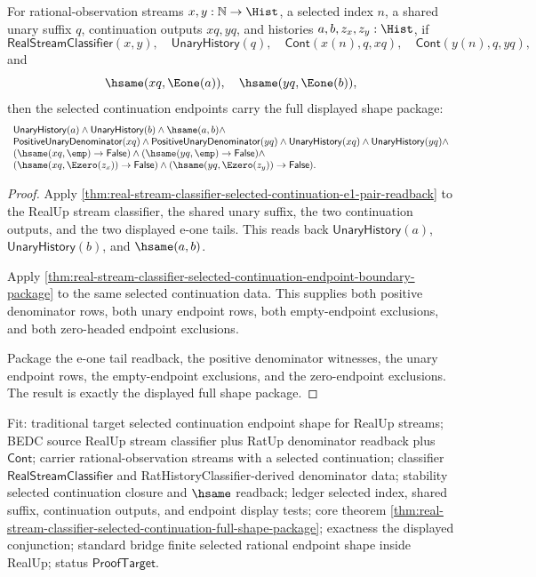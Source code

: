 \begin{theorem}
\label{thm:real-stream-classifier-selected-continuation-full-shape-package}
For rational-observation streams $x,y:\mathbb{N}\to\Hist$, a selected index
$n$, a shared unary suffix $q$, continuation outputs $xq,yq$, and histories
$a,b,z_x,z_y:\Hist$, if
$$
\mathsf{RealStreamClassifier}(x,y),\quad
\mathsf{UnaryHistory}(q),\quad
\mathsf{Cont}(x(n),q,xq),\quad
\mathsf{Cont}(y(n),q,yq),
$$
and
$$
\hsame(xq,\Eone(a)),\quad \hsame(yq,\Eone(b)),
$$
then the selected continuation endpoints carry the full displayed shape package:
$$
\begin{array}{l}
\mathsf{UnaryHistory}(a)\land
\mathsf{UnaryHistory}(b)\land
\hsame(a,b)\land\\
\mathsf{PositiveUnaryDenominator}(xq)\land
\mathsf{PositiveUnaryDenominator}(yq)\land
\mathsf{UnaryHistory}(xq)\land
\mathsf{UnaryHistory}(yq)\land\\
(\hsame(xq,\emp)\to\mathsf{False})\land
(\hsame(yq,\emp)\to\mathsf{False})\land\\
(\hsame(xq,\Ezero(z_x))\to\mathsf{False})\land
(\hsame(yq,\Ezero(z_y))\to\mathsf{False}).
\end{array}
$$
\end{theorem}
\begin{proof}
Apply
\autoref{thm:real-stream-classifier-selected-continuation-e1-pair-readback}
to the RealUp stream classifier, the shared unary suffix, the two continuation
outputs, and the two displayed e-one tails. This reads back
$\mathsf{UnaryHistory}(a)$, $\mathsf{UnaryHistory}(b)$, and $\hsame(a,b)$.

Apply
\autoref{thm:real-stream-classifier-selected-continuation-endpoint-boundary-package}
to the same selected continuation data. This supplies both positive denominator
rows, both unary endpoint rows, both empty-endpoint exclusions, and both
zero-headed endpoint exclusions.

Package the e-one tail readback, the positive denominator witnesses, the unary
endpoint rows, the empty-endpoint exclusions, and the zero-endpoint exclusions.
The result is exactly the displayed full shape package.
\end{proof}

Fit: traditional target selected continuation endpoint shape for RealUp streams;
BEDC source RealUp stream classifier plus RatUp denominator readback plus
$\mathsf{Cont}$; carrier rational-observation streams with a selected
continuation; classifier $\mathsf{RealStreamClassifier}$ and
RatHistoryClassifier-derived denominator data; stability selected continuation
closure and $\hsame$ readback; ledger selected index, shared suffix,
continuation outputs, and endpoint display tests; core theorem
\autoref{thm:real-stream-classifier-selected-continuation-full-shape-package};
exactness the displayed conjunction; standard bridge finite selected rational
endpoint shape inside RealUp; status $\mathsf{ProofTarget}$.
